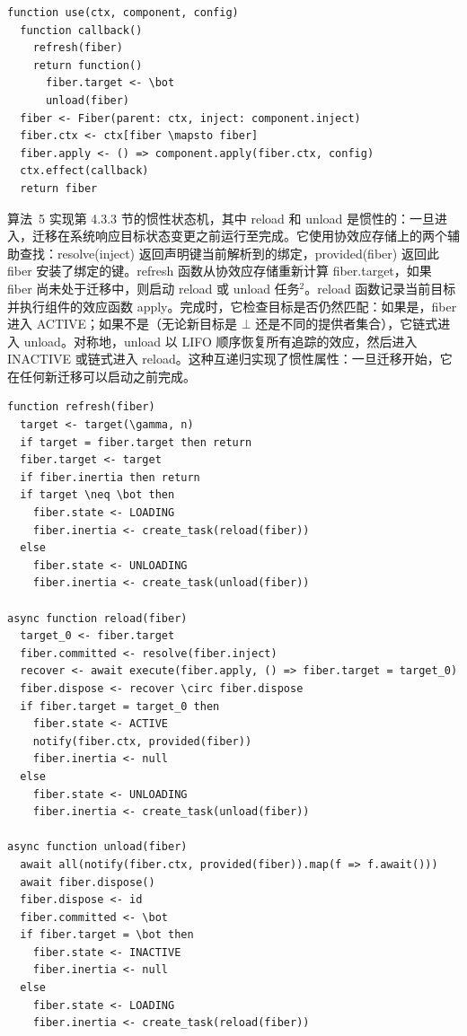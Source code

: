 \begin{lstlisting}[caption={组件实例化}]
function use(ctx, component, config)
  function callback()
    refresh(fiber)
    return function()
      fiber.target <- \bot
      unload(fiber)
  fiber <- Fiber(parent: ctx, inject: component.inject)
  fiber.ctx <- ctx[fiber \mapsto fiber]
  fiber.apply <- () => component.apply(fiber.ctx, config)
  ctx.effect(callback)
  return fiber
\end{lstlisting}

算法~5 实现第 4.3.3 节的惯性状态机，其中 reload 和 unload 是惯性的：一旦进入，迁移在系统响应目标状态变更之前运行至完成。它使用协效应存储上的两个辅助查找：resolve(inject) 返回声明键当前解析到的绑定，provided(fiber) 返回此 fiber 安装了绑定的键。refresh 函数从协效应存储重新计算 fiber.target，如果 fiber 尚未处于迁移中，则启动 reload 或 unload 任务$^2$。reload 函数记录当前目标并执行组件的效应函数 apply。完成时，它检查目标是否仍然匹配：如果是，fiber 进入 ACTIVE；如果不是（无论新目标是 $\bot$ 还是不同的提供者集合），它链式进入 unload。对称地，unload 以 LIFO 顺序恢复所有追踪的效应，然后进入 INACTIVE 或链式进入 reload。这种互递归实现了惯性属性：一旦迁移开始，它在任何新迁移可以启动之前完成。

\begin{lstlisting}[caption={组件生命周期}]
function refresh(fiber)
  target <- target(\gamma, n)
  if target = fiber.target then return
  fiber.target <- target
  if fiber.inertia then return
  if target \neq \bot then
    fiber.state <- LOADING
    fiber.inertia <- create_task(reload(fiber))
  else
    fiber.state <- UNLOADING
    fiber.inertia <- create_task(unload(fiber))

async function reload(fiber)
  target_0 <- fiber.target
  fiber.committed <- resolve(fiber.inject)
  recover <- await execute(fiber.apply, () => fiber.target = target_0)
  fiber.dispose <- recover \circ fiber.dispose
  if fiber.target = target_0 then
    fiber.state <- ACTIVE
    notify(fiber.ctx, provided(fiber))
    fiber.inertia <- null
  else
    fiber.state <- UNLOADING
    fiber.inertia <- create_task(unload(fiber))

async function unload(fiber)
  await all(notify(fiber.ctx, provided(fiber)).map(f => f.await()))
  await fiber.dispose()
  fiber.dispose <- id
  fiber.committed <- \bot
  if fiber.target = \bot then
    fiber.state <- INACTIVE
    fiber.inertia <- null
  else
    fiber.state <- LOADING
    fiber.inertia <- create_task(reload(fiber))
\end{lstlisting}

